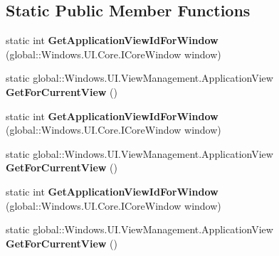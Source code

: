 \subsection*{Static Public Member Functions}
\begin{DoxyCompactItemize}
\item 
\mbox{\label{class_windows_1_1_u_i_1_1_view_management_1_1_application_view_a676c20afecc52a042bd74db84f154257}} 
static int {\bfseries Get\+Application\+View\+Id\+For\+Window} (global\+::\+Windows.\+U\+I.\+Core.\+I\+Core\+Window window)
\item 
\mbox{\label{class_windows_1_1_u_i_1_1_view_management_1_1_application_view_a0d3252d3db6f56163e9ca7abe9623c21}} 
static global\+::\+Windows.\+U\+I.\+View\+Management.\+Application\+View {\bfseries Get\+For\+Current\+View} ()
\item 
\mbox{\label{class_windows_1_1_u_i_1_1_view_management_1_1_application_view_a676c20afecc52a042bd74db84f154257}} 
static int {\bfseries Get\+Application\+View\+Id\+For\+Window} (global\+::\+Windows.\+U\+I.\+Core.\+I\+Core\+Window window)
\item 
\mbox{\label{class_windows_1_1_u_i_1_1_view_management_1_1_application_view_a0d3252d3db6f56163e9ca7abe9623c21}} 
static global\+::\+Windows.\+U\+I.\+View\+Management.\+Application\+View {\bfseries Get\+For\+Current\+View} ()
\item 
\mbox{\label{class_windows_1_1_u_i_1_1_view_management_1_1_application_view_a676c20afecc52a042bd74db84f154257}} 
static int {\bfseries Get\+Application\+View\+Id\+For\+Window} (global\+::\+Windows.\+U\+I.\+Core.\+I\+Core\+Window window)
\item 
\mbox{\label{class_windows_1_1_u_i_1_1_view_management_1_1_application_view_a0d3252d3db6f56163e9ca7abe9623c21}} 
static global\+::\+Windows.\+U\+I.\+View\+Management.\+Application\+View {\bfseries Get\+For\+Current\+View} ()

\end{DoxyCompactItemize}
